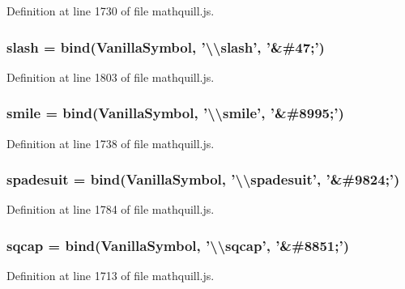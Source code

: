 Definition at line 1730 of file mathquill.\-js.

\subsubsection[{slash}]{ slash = {\bf bind}({\bf Vanilla\-Symbol}, '\textbackslash{}\textbackslash{}slash', '\&\#47;')}\label{mathquill_8js_aaa66fce7637b857bfaa91899092bb3f5}


Definition at line 1803 of file mathquill.\-js.

\subsubsection[{smile}]{ smile = {\bf bind}({\bf Vanilla\-Symbol}, '\textbackslash{}\textbackslash{}smile', '\&\#8995;')}\label{mathquill_8js_ad52f282bdbf9879e7ffe639e3079ab5a}


Definition at line 1738 of file mathquill.\-js.

\subsubsection[{spadesuit}]{ spadesuit = {\bf bind}({\bf Vanilla\-Symbol}, '\textbackslash{}\textbackslash{}spadesuit', '\&\#9824;')}\label{mathquill_8js_a2551d79ace2ac564cf8cac47f6d5fe2f}


Definition at line 1784 of file mathquill.\-js.

\subsubsection[{sqcap}]{ sqcap = {\bf bind}({\bf Vanilla\-Symbol}, '\textbackslash{}\textbackslash{}sqcap', '\&\#8851;')}\label{mathquill_8js_a4420cce945b69ad95acab8144c0c3e2f}


Definition at line 1713 of file mathquill.\-js.

